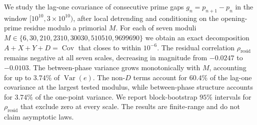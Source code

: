 We study the lag-one covariance of consecutive prime gaps $g_n = p_{n+1}-p_n$ in the window $[10^{10}, 3\times 10^{10})$, after local detrending and conditioning on the opening-prime residue modulo a primorial $M$. For each of seven moduli $M \in \{6, 30, 210, 2310, 30030, 510510, 9699690\}$ we obtain an exact decomposition $A+X+Y+D=\operatorname{Cov}$ that closes to within $10^{-6}$. The residual correlation $\rho_{\text{resid}}$ remains negative at all seven scales, decreasing in magnitude from $-0.0247$ to $-0.0103$. The between-phase variance grows monotonically with $M$, accounting for up to $3.74\%$ of $\operatorname{Var}(e)$. The non-$D$ terms account for $60.4\%$ of the lag-one covariance at the largest tested modulus, while between-phase structure accounts for $3.74\%$ of the one-point variance. We report block-bootstrap $95\%$ intervals for $\rho_{\text{resid}}$ that exclude zero at every scale. The results are finite-range and do not claim asymptotic laws.
